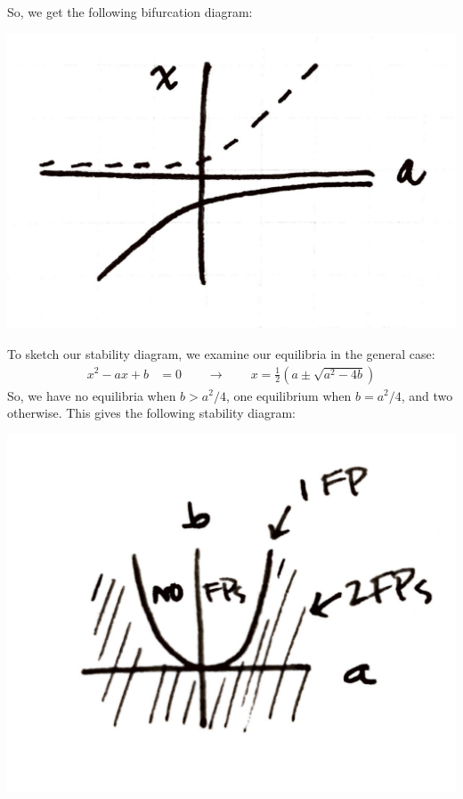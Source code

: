 \documentclass[10pt,letterpaper]{report}
\newcommand{\so}{\qquad \rightarrow \qquad}
\begin{document}
\begin{enumerate}
\begin{center}
\end{center}
So, we get the following bifurcation diagram:
\begin{center}
\includegraphics[height=0.2\textwidth]{img/2015S2-6.png}
\end{center}
To sketch our stability diagram, we examine our equilibria in the general case:
\begin{align*}
    x^2 - ax + b &= 0 \so x = \frac{1}{2}\left(a \pm \sqrt{a^2 - 4b}\right)
\end{align*}
So, we have no equilibria when $b > a^2/4$, one equilibrium when $b = a^2/4$, and two otherwise. This gives the following stability diagram:
\begin{center}
\includegraphics[height=0.3\textwidth]{img/2015S2-7.png}
\end{center}



\end{enumerate}
\end{document}
